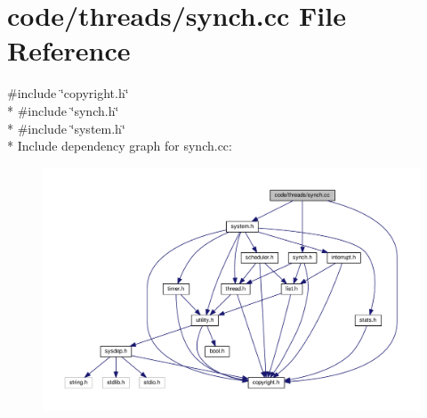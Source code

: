 \section{code/threads/synch.cc File Reference}
\label{synch_8cc}
{\ttfamily \#include \char`\"{}copyright.\+h\char`\"{}}\\*
{\ttfamily \#include \char`\"{}synch.\+h\char`\"{}}\\*
{\ttfamily \#include \char`\"{}system.\+h\char`\"{}}\\*
Include dependency graph for synch.\+cc\+:
\nopagebreak
\begin{figure}[H]
\begin{center}
\leavevmode
\includegraphics[width=350pt]{synch_8cc__incl}
\end{center}
\end{figure}
